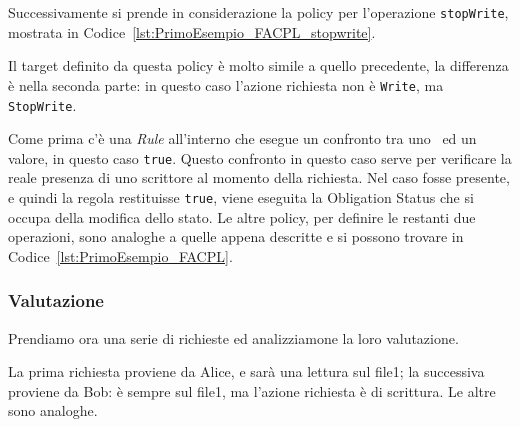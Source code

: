 Successivamente si prende in considerazione la policy per l'operazione \texttt{stopWrite}, mostrata in Codice~\ref{lst:PrimoEsempio_FACPL_stopwrite}.

Il target definito da questa policy è molto simile a quello precedente, la differenza è nella seconda parte: in questo caso l'azione richiesta non è \texttt{Write}, ma \texttt{StopWrite}.\par
Come prima c'è una \textit{Rule} all'interno che esegue un confronto tra uno \statusattribute\ ed un valore, in questo caso \texttt{true}. Questo confronto in questo caso serve per verificare la reale presenza di uno scrittore al momento della richiesta. 
Nel caso fosse presente, e quindi la regola restituisse \texttt{true}, viene eseguita la Obligation Status che si occupa della modifica dello stato.
Le altre policy, per definire le restanti due operazioni, sono analoghe a quelle appena descritte e si possono trovare in Codice~\ref{lst:PrimoEsempio_FACPL}.
\subsubsection{Valutazione}
Prendiamo ora una serie di richieste ed analizziamone la loro valutazione.

La prima richiesta proviene da Alice, e sarà una lettura sul file1; la successiva proviene da Bob: è sempre sul file1, ma l'azione richiesta è di scrittura. Le altre sono analoghe.\par

